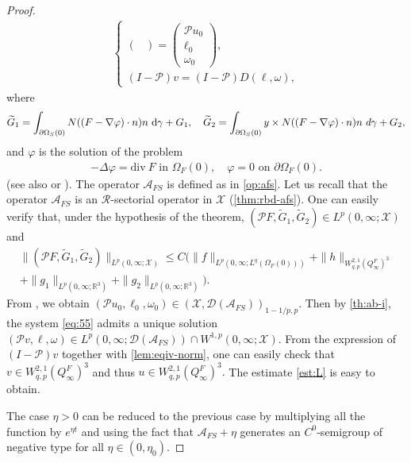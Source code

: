\documentclass[12pt,a4paper,reqno]{amsart}
\theoremstyle{definition}
\theoremstyle{remark}
\numberwithin{equation}{section}
\newcommand{\oso}{\Omega_{S}(0)}
\newcommand{\ofo}{\Omega_{F}(0)}
\newcommand{\rt}{\mathbb{R}^{3}}
\newcommand{\poso}{\partial\oso}
\newcommand{\mx}{\mathcal{X}}
\newcommand{\mr}{\mathcal{R}}
\newcommand{\mpp}{\mathcal{P}}
\newcommand{\dg}{{\rm d} \gamma}
\begin{document}
\begin{proof}
\begin{align}
\begin{cases}
\begin{pmatrix}
\end{pmatrix} = \begin{pmatrix}
\mpp u_{0} \\ \ell_{0} \\ \omega_{0}
\end{pmatrix},   \\
 (I - \mpp) v = (I - \mpp) D(\ell, \omega), 
\end{cases}
\end{align}
where
\begin{align*}
\widetilde G_{1} =  \int_{\poso} N((F -  \nabla \varphi)\cdot n) n \ \dg + G_{1},  \quad \widetilde G_{2} = \int_{\poso} y \times N((F -  \nabla \varphi)\cdot n) n \ d\gamma + G_{2},
\end{align*}
and $\varphi$ is the solution of the problem
\begin{align*}
-\Delta \varphi = \mathrm{div} \ F \mbox{ in } \ofo, \quad \varphi = 0 \mbox{ on } \partial \ofo.
\end{align*}
(see also \cite[Section 4.2]{Raymond-fsi}  or \cite[Proposition 3.7]{MR17}). The operator $\mathcal{A}_{FS}$ is defined as in \eqref{op:afs}. Let us recall that the operator $\mathcal{A}_{FS}$ is an $\mr$-sectorial operator in $\mx$ (\cref{thm:rbd-afs}).  One can easily verify that, under the hypothesis of the theorem, $(\mpp F, \widetilde G_{1}, \widetilde G_{2}) \in L^{p}(0,\infty;\mx)$ and
\begin{multline*}
\|(\mpp F, \widetilde G_{1}, \widetilde G_{2})\|_{L^{p}(0,\infty;\mx)} \leqslant C \Big(  \| f \|_{L^{p}(0,\infty;L^{q}(\ofo))} + \| h\|_{W^{2,1}_{q,p} (Q^{F}_{\infty})^{3}} \\
+ \| g_{1} \|_{L^{p}(0,\infty;\rt)} + \| g_{2} \|_{L^{p}(0,\infty;\rt)}\Big).
\end{multline*}
From \cite[Theorem 3.4]{Amann00}, we obtain $(\mpp u_{0}, \ell_{0}, \omega_{0}) \in  (\mx, \mathcal{D}(\mathcal{A}_{FS}))_{1-1/p,p}.$ Then by \cref{th:ab-i},  the system \eqref{eq:55} admits a unique solution
$(\mpp v, \ell, \omega) \in L^{p}(0,\infty;\mathcal{D}(\mathcal{A}_{FS})) \cap W^{1,p}(0,\infty;\mx).$  From the expression of $(I-\mpp)v$ together with \cref{lem:eqiv-norm}, one can easily check that $v \in W^{2,1}_{q,p}(Q_{\infty}^{F})^{3}$ and thus  $u \in W^{2,1}_{q,p}(Q_{\infty}^{F})^{3}.$ The estimate \eqref{est:L} is easy to obtain.

The case $\eta > 0$ can be reduced to the previous case by multiplying all the function by $e^{\eta t}$ and using the fact that $\mathcal{A}_{FS} + \eta$ generates an $C^{0}$-semigroup of negative type for all $\eta \in (0, \eta_{0}).$
\end{proof}
\end{document}

